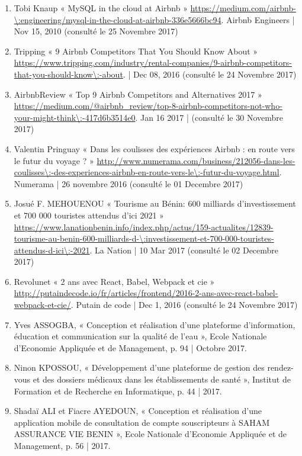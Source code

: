 \begin{enumerate}
	\item Tobi Knaup « MySQL in the cloud at Airbnb » \url{https://medium.com/airbnb-\:engineering/mysql-in-the-cloud-at-airbnb-336e5666bc94}. Airbnb Engineers | Nov 15, 2010 (consulté le 25 Novembre 2017)
	\item Tripping « 9 Airbnb Competitors That You Should Know About » \url{https://www.tripping.com/industry/rental-companies/9-airbnb-competitors-that-you-should-know\:-about}. | Dec 08, 2016 (consulté le 24 Novembre 2017)
	\item AirbnbReview « Top 9 Airbnb Competitors and Alternatives 2017 » \url{https://medium.com/@airbnb_review/top-8-airbnb-competitors-not-who-your-might-think\:-417d6b3514e0}. Jan 16 2017 | (consulté le 30 Novembre 2017)
	\item \begin{flushleft}Valentin Pringuay « Dans les coulisses des expériences Airbnb : en route vers le futur du voyage ? » \url{http://www.numerama.com/business/212056-dans-les-coulisses\:-des-experiences-airbnb-en-route-vers-le\:-futur-du-voyage.html}. Numerama | 26 novembre 2016 (consulté le 01 Decembre 2017)\end{flushleft}
	\item Josué F. MEHOUENOU « Tourisme au Bénin: 600 milliards d’investissement et 700 000 touristes attendus d’ici 2021 » \url{https://www.lanationbenin.info/index.php/actus/159-actualites/12839-tourisme-au-benin-600-milliards-d-\:investissement-et-700-000-touristes-attendus-d-ici\:-2021}. La Nation | 10 Mar 2017 (consulté le 02 Decembre 2017)
	\item Revolunet « 2 ans avec React, Babel, Webpack et cie » \url{http://putaindecode.io/fr/articles/frontend/2016-2-ans-avec-react-babel-webpack-et-cie/}. Putain de code | Dec 1, 2016 (consulté le 24 Novembre 2017)
	\item Yves ASSOGBA, « Conception et réalisation d’une plateforme d’information, éducation et communication sur la qualité de l'eau », Ecole Nationale d’Economie Appliquée et de Management, p. 94 | Octobre 2017.
	\item Ninon KPOSSOU, « Développement d’une plateforme de gestion des rendez-vous et des dossiers médicaux dans les établissements de santé », Institut de Formation et de Recherche en Informatique, p. 44 | 2017.
	\item Shadaï ALI et Fiacre AYEDOUN, « Conception et réalisation d’une application mobile de consultation de compte souscripteurs à
	SAHAM ASSURANCE VIE BENIN », Ecole Nationale d’Economie Appliquée et de Management, p. 56 | 2017.
\end{enumerate}
